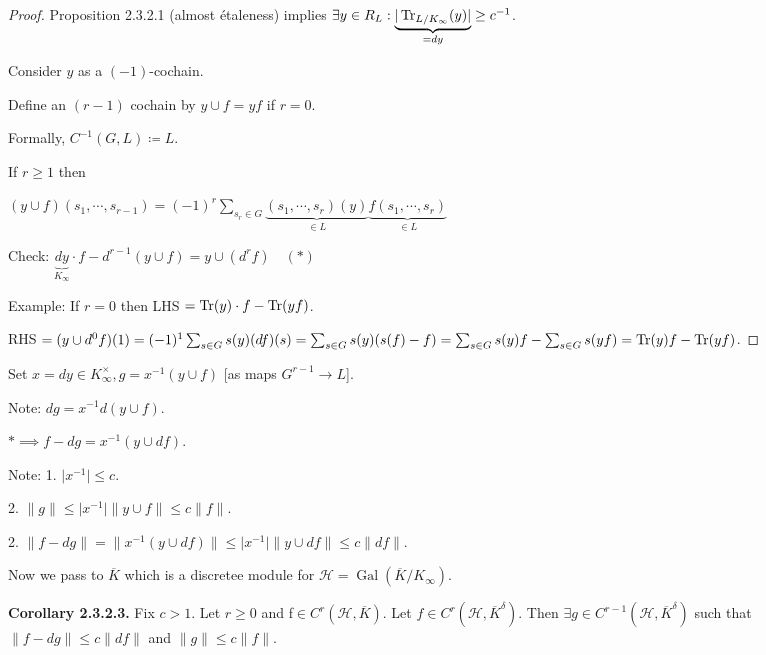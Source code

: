 \documentclass{article}
\theoremstyle{definition}
\numberwithin{theorem}{subsection}
\begin{document}
    \begin{proof}
        Proposition 2.3.2.1 (almost \'etaleness) implies \(\exists y\in R_L : \underbrace{\vert \Tr_{L / K_\infty}(y) \vert}_{=dy} \geq c ^{-1} \).
        
        Consider \(y\) as a \((-1)\)-cochain. 

        Define an \((r-1)\) cochain by \(y \cup f = yf\) if \(r = 0\).

        Formally, \(C ^{-1}(G, L) \coloneqq L\).

        If \(r \geq 1\) then
        
        \((y\cup f)(s_1, \cdots , s_{r-1}) = (-1)^r \sum_{s_r \in G} \underbrace{(s_1, \cdots ,s_r)(y)}_{\in L} \underbrace{f(s_1, \cdots , s_r)}_{\in L} \) 

        Check: \(\underbrace{dy}_{K_\infty} \cdot f - d^{r-1} (y\cup f) = y \cup (d^r f) \quad (\ast)\) 

        Example: If \(r=0\) then LHS \(= \Tr(y) \cdot f - \Tr(y f)\).
        
        RHS \(= (y\cup d^0 f)(1) = (-1)^1 \sum_{s\in G} s(y) (df)(s) =  \sum_{s\in G} s(y) (s(f)-f) = \sum_{s\in G} s(y) f - \sum_{s\in G} s(yf) = \Tr(y)f - \Tr(yf)\).
    \end{proof}

    Set \(x = dy \in K_\infty^\times, g = x ^{-1} (y \cup f)\) [as maps \(G^{r-1} \to L\)].

    Note: \(dg = x ^{-1} d(y\cup f)\).
    
    \(\ast \implies f - dg = x ^{-1} (y \cup df)\).

    Note: 1. \(\vert x ^{-1} \vert \leq c\).
    
    2. \(\lVert g \rVert \leq \vert x ^{-1} \vert \lVert y \cup f \rVert \leq c \lVert f \rVert\).

    2. \(\lVert f - dg \rVert = \lVert x ^{-1} (y\cup df)  \rVert \leq \vert x ^{-1}  \vert \lVert y\cup df \rVert \leq c \lVert df \rVert\).

    Now we pass to \(\overline{K}\) which is a discretee module for \(\mathscr{H} = \operatorname{Gal}(\overline{K} / K_\infty)\).

    \textbf{Corollary 2.3.2.3.} Fix \(c > 1\). Let \(r \geq 0\) and f\(\in C^r(\mathscr{H}, \overline{K})\). Let \(f\in C^r(\mathscr{H}, \overline{K}^\delta)\). Then \(\exists g\in C^{r-1} (\mathscr{H}, \overline{K}^\delta)\) such that \(\lVert f - dg \rVert \leq c \lVert df \rVert \) and \(\lVert g \rVert \leq c \lVert f \rVert\).
    
\end{document}
